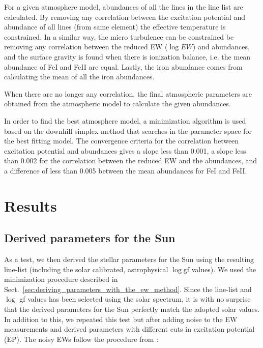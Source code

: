 \documentclass{aa}
\begin{document}
For a given atmosphere model, abundances of all the lines in the line
list are calculated. By removing any correlation between the excitation
potential and abundance of all lines (from same element) the effective
temperature is constrained. In a similar way, the micro turbulence can
be constrained be removing any correlation between the reduced EW ($\log
EW$) and abundances, and the surface gravity is found when there is
ionization balance, i.e. the mean abundance of FeI and FeII are equal.
Lastly, the iron abundance comes from calculating the mean of
all the iron abundances.

When there are no longer any correlation, the final atmospheric
parameters are obtained from the atmospheric model to calculate the
given abundances.

In order to find the best atmosphere model, a minimization algorithm
is used based on the downhill simplex method \citep{Press1992} that
searches in the parameter space for the best fitting model. The
convergence criteria for the correlation between excitation potential
and abundances gives a slope less than 0.001, a slope less than 0.002
for the correlation between the reduced EW and the abundances, and a
difference of less than 0.005 between the mean abundances for FeI and
FeII.







\section{Results}
\label{sec:results}


\subsection{Derived parameters for the Sun}
\label{sec:derived_parameters_of_the_sun}

As a test, we then derived the stellar parameters for the Sun using
the resulting line-list (including the solar calibrated, astrophysical
$\log \mathrm{gf}$ values). We used the minimization procedure described
in Sect.~\ref{sec:deriving_parameters_with_the_ew_method}. Since the
line-list and $\log$ gf values has been selected using the solar
spectrum, it is with no surprise that the derived parameters for the
Sun perfectly match the adopted solar values. In addition to this, we
repeated this test but after adding noise to the EW measurements and
derived parameters with different cuts in excitation potential (EP). The
noisy EWs follow the procedure from \cite{Caryel1988}:
\end{document}
